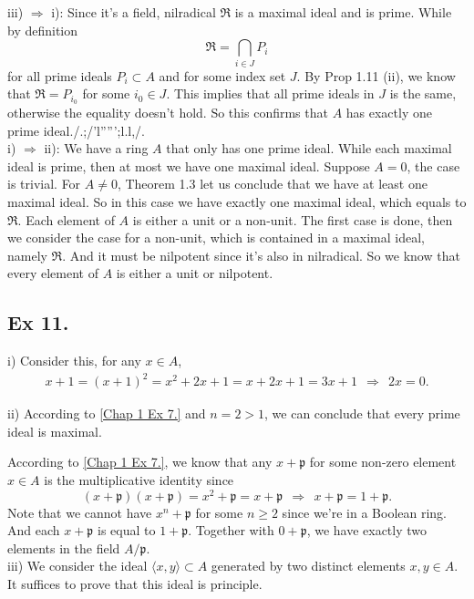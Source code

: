 \noindent iii) $\Rightarrow$ i): Since it's a field, nilradical $\mathfrak R$ is a maximal ideal and is prime.
While by definition 
$$\mathfrak R=\bigcap_{i\in J} P_i$$ for all prime ideals $P_i\subset A$ and for some index set $J$. By Prop 1.11 (ii), we know that $\mathfrak R=P_{i_0}$ for some $i_0\in J$. This implies that all prime ideals in $J$ is the same, otherwise the equality doesn't hold. So this confirms that $A$ has exactly one prime ideal./.;/'l''''';l.l,/.\\

\noindent i) $\Rightarrow$ ii): We have a ring $A$ that only has one prime ideal. While each maximal ideal is prime, then at most we have one maximal ideal. Suppose $A=0$, the case is trivial. For $A\neq 0$, Theorem 1.3 let us conclude that we have at least one maximal ideal. So in this case we have exactly one maximal ideal, which equals to $\mathfrak R$. Each element of $A$ is either a unit or a non-unit. The first case is done, then we consider the case for a non-unit, which is contained in a maximal ideal, namely $\mathfrak R$. And it must be nilpotent since it's also in nilradical. So we know that every element of $A$ is either a unit or nilpotent.

\subsection{Ex 11.}

i) Consider this, for any $x\in A$, \begin{align*}
    x+1=(x+1)^2=x^2+2x+1=x+2x+1=3x+1
    ~~\Rightarrow~~ 2x=0.
\end{align*}

\noindent ii) According to \ref{Chap 1 Ex 7.} and $n=2>1$, we can conclude that every prime ideal is maximal.

According to \ref{Chap 1 Ex 7.}, we know that any $x+\mathfrak p$ for some non-zero element $x\in A$ is the multiplicative identity since
$$(x+\mathfrak p)(x+\mathfrak p)=x^2+\mathfrak p=x+\mathfrak p ~~\Rightarrow~~ x+\mathfrak p =1+\mathfrak p.$$
Note that we cannot have $x^n+\mathfrak p$ for some $n\geq 2$ since we're in a Boolean ring. And each $x+\mathfrak p$ is equal to $1+\mathfrak p$.
Together with $0+\mathfrak p$, we have exactly two elements in the field $A/\mathfrak p$.\\

\noindent iii) We consider the ideal $\langle x,y\rangle \subset A$ generated by two distinct elements $x,y\in A$. It suffices to prove that this ideal is principle.

